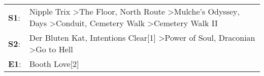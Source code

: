 \begin{supertabular}{p{0.03\textwidth}p{0.92\textwidth}}
 \textbf{S1}:  &  Nipple Trix\textsuperscript{} \textgreater \enspace The Floor\textsuperscript{}, \enspace North Route\textsuperscript{} \textgreater \enspace Mulche's Odyssey\textsuperscript{},  Days\textsuperscript{} \textgreater \enspace Conduit\textsuperscript{}, \enspace Cemetery Walk\textsuperscript{} \textgreater \enspace Cemetery Walk II\textsuperscript{}  \enspace  \\
 \textbf{S2}:  &                                                                                                                                          Der Bluten Kat\textsuperscript{}, \enspace Intentions Clear[1]\textsuperscript{} \textgreater \enspace Power of Soul\textsuperscript{}, \enspace Draconian\textsuperscript{} \textgreater \enspace Go to Hell\textsuperscript{}  \enspace  \\
 \textbf{E1}:  &                                                                                                                                                                                                                                                                                                                                          Booth Love[2]\textsuperscript{}  \enspace  \\
\end{supertabular}
